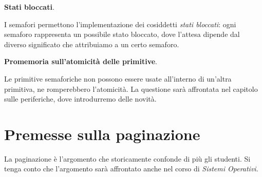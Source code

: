 \documentclass[11pt]{report}
\theoremstyle{definition}
\begin{document}
\begin{framed}
\noindent \textbf{Stati bloccati}.

\noindent I semafori permettono l'implementazione dei cosiddetti \emph{stati bloccati}: ogni semaforo rappresenta un possibile stato bloccato, dove l'attesa dipende dal diverso significato che attribuiamo a un certo semaforo.
\end{framed} 

\begin{framed}
	\noindent \textbf{Promemoria sull'atomicità delle primitive}.
	
	\noindent Le primitive semaforiche non possono essere usate all'interno di un'altra primitiva, ne romperebbero l'atomicità. La questione sarà affrontata nel capitolo sulle periferiche, dove introdurremo delle novità.
\end{framed} 

\chapter{Premesse sulla paginazione}
La paginazione è l'argomento che storicamente confonde di più gli studenti. Si tenga conto che l'argomento sarà affrontato anche nel corso di \textit{Sistemi Operativi}.
\end{document}
